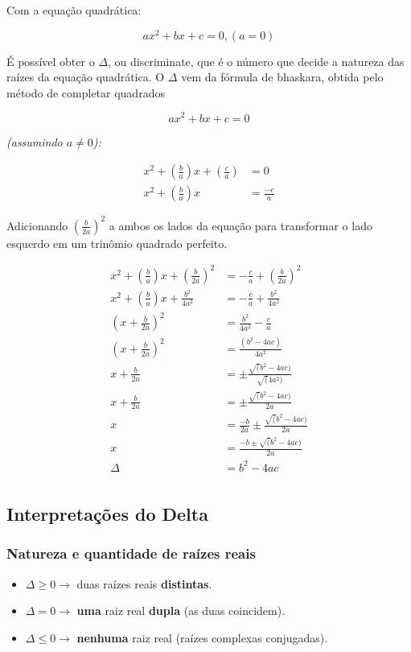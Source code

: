 \documentclass[../resumo.tex]{subfiles}
\begin{document}
	Com a equação quadrática:

	\[ ax^2 + bx + c = 0, (a = 0) \]

	É possível obter o $\Delta$, ou discriminate, que é o número que decide a natureza das raízes da equação quadrática.
	O $\Delta$ vem da fórmula de bhaskara, obtida pelo método de completar quadrados 

	\[ ax^2 + bx + c = 0 \]

	\textit{(assumindo $a \neq 0$):}

	\begin{align*}
		x^2 + (\frac{b}{a})x + (\frac{c}{a}) &= 0 \\
		x^2 + (\frac{b}{a})x &= \frac{-c}{a}
	\end{align*}

	Adicionando $(\frac{b}{2a})^2$ a ambos os lados da equação para transformar o lado esquerdo em um trinômio quadrado perfeito.

	\begin{align*}
		x^2 + (\frac{b}{a})x + (\frac{b}{2a})^2 &= -\frac{c}{a} + (\frac{b}{2a})^2 \\
		x^2 + (\frac{b}{a})x + \frac{b^2}{4a^2} &= -\frac{c}{a} + \frac{b^2}{4a^2} \\
		(x + \frac{b}{2a})^2 &= \frac{b^2}{4a^2} - \frac{c}{a} \\
		(x + \frac{b}{2a})^2 &= \frac{(b^2 - 4ac)}{4a^2} \\
		x + \frac{b}{2a} &= \pm\frac{\surd(b^2 - 4ac)}{\surd(4a^2)} \\
		x + \frac{b}{2a} &= \pm\frac{\surd(b^2 - 4ac)}{2a} \\
		x &= \frac{-b}{2a} \pm \frac{\surd(b^2 - 4ac)}{2a} \\
		x &= \frac{-b \pm \surd(b^2 - 4ac)}{2a} \\
		\Delta &= b^2 - 4ac \\
	\end{align*}

	\subsection{Interpretações do Delta}

	\subsubsection{Natureza e quantidade de raízes reais}
	
	\begin{itemize}
		\item $\Delta \geq 0 \to$ duas raízes reais \textbf{distintas}.
		\item $\Delta = 0 \rightarrow$ \textbf{uma} raiz real \textbf{dupla} (as duas coincidem).
		\item $\Delta \leq 0 \rightarrow$ \textbf{nenhuma} raiz real (raízes complexas conjugadas).
	\end{itemize}
\end{document}
